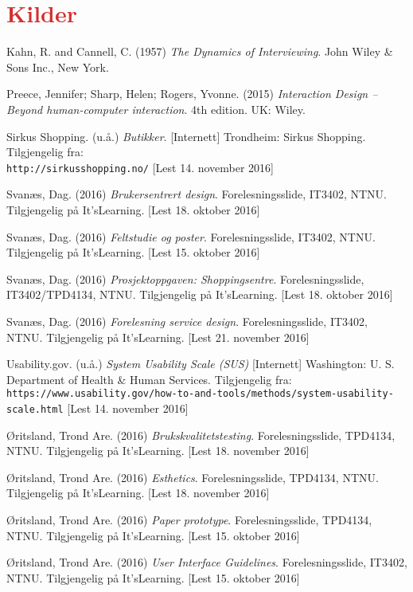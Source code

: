 \section{\textcolor[HTML]{D32F2F}{Kilder}}
\begin{thebibliography}{30}
Kahn, R. and Cannell, C. (1957) \textit{The Dynamics of Interviewing}. John Wiley \& Sons Inc., New York.

Preece, Jennifer; Sharp, Helen; Rogers, Yvonne. (2015) \textit{Interaction Design – Beyond human-computer interaction}. 4th edition. UK: Wiley.

Sirkus Shopping. (u.å.) \textit{Butikker}. [Internett] Trondheim: Sirkus Shopping. Tilgjengelig fra: \\\texttt{http://sirkusshopping.no/} [Lest 14. november 2016]

Svanæs, Dag. (2016) \textit{Brukersentrert design}. Forelesningsslide, IT3402, NTNU. Tilgjengelig på It’sLearning. [Lest 18. oktober 2016]

Svanæs, Dag. (2016) \textit{Feltstudie og poster}. Forelesningsslide, IT3402, NTNU. Tilgjengelig på It’sLearning. [Lest 15. oktober 2016]

Svanæs, Dag. (2016) \textit{Prosjektoppgaven: Shoppingsentre}. Forelesningsslide, IT3402/TPD4134, NTNU. Tilgjengelig på It’sLearning. [Lest 18. oktober 2016]

Svanæs, Dag. (2016) \textit{Forelesning service design}. Forelesningsslide, IT3402, NTNU. Tilgjengelig på It’sLearning. [Lest 21. november 2016]

Usability.gov. (u.å.) \textit{System Usability Scale (SUS)} [Internett] Washington: U. S. Department of Health \& Human Services. Tilgjengelig fra:\\ \texttt{https://www.usability.gov/how-to-and-tools/methods/system-usability-scale.html} [Lest 14. november 2016]

Øritsland, Trond Are. (2016) \textit{Brukskvalitetstesting}. Forelesningsslide, TPD4134, NTNU. Tilgjengelig på It’sLearning. [Lest 18. november 2016]

Øritsland, Trond Are. (2016) \textit{Esthetics}. Forelesningsslide, TPD4134, NTNU. Tilgjengelig på It’sLearning. [Lest 18. november 2016]

Øritsland, Trond Are. (2016) \textit{Paper prototype}. Forelesningsslide, TPD4134, NTNU. Tilgjengelig på It’sLearning. [Lest 15. oktober 2016]

Øritsland, Trond Are. (2016) \textit{User Interface Guidelines}. Forelesningsslide, IT3402, NTNU. Tilgjengelig på It’sLearning. [Lest 15. oktober 2016]

\end{thebibliography}